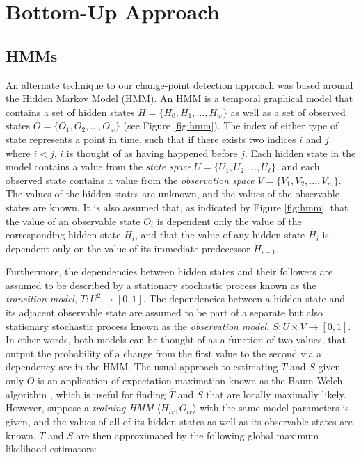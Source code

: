 \section{Bottom-Up Approach}
\label{sec:bottomup}

\subsection{HMMs}

An alternate technique to our change-point detection approach was based around
the Hidden Markov Model (HMM). An HMM is a temporal graphical model that contains a set of hidden states
$H = \{H_0,H_1, \ldots, H_w\}$ as well as a set of
observed states $O = \{O_1,O_2, \ldots, O_w\}$ (see Figure \ref{fig:hmm}). The index
of either type of state represents a point in time, such that if there exists
two indices $i$ and $j$ where $i < j$, $i$ is thought of as having happened
before $j$. Each hidden state in the model contains a value from the
\emph{state space} $U=\{U_1,U_2, \ldots, U_{\ell}\}$, and each
observed state contains a value from the \emph{observation space}
$V=\{V_1,V_2, \ldots, V_m\}$.
The values of the hidden states are unknown, and the values of the observable
states are known.
It is also assumed that, as indicated by Figure \ref{fig:hmm}, that the
value of an observable state $O_i$ is dependent only the value of the corresponding
hidden state $H_i$, and that the value of any hidden state $H_i$ is dependent only on
the value of its immediate predecessor $H_{i-1}$.

Furthermore, the dependencies between hidden states and their followers are
assumed to be described by a stationary stochastic process known as the
\emph{transition model}, \mbox{$T: U^2 \rightarrow [0,1]$}. The dependencies
between a hidden state and its adjacent observable state are assumed to be part
of a separate but also stationary stochastic process known as the
\emph{observation model}, $S: U \times V \rightarrow [0,1]$. In other words,
both models can be thought of as a function of two values, that output the
probability of a change from the first value to the second via a dependency
arc in the HMM. The usual approach to estimating $T$ and $S$ given only
$O$ is an application of expectation maximation known as the Baum-Welch algorithm
\cite{baum70},
which is useful for finding $\hat{T}$ and $\hat{S}$ that are locally maximally
likely. However, suppose a \emph{training HMM} $\langle H_{tr},O_{tr} \rangle$
with the same model parameters is given, and the values of all of its hidden states as well as its
observable states are known. $T$ and $S$ are then approximated by the
following global maximum likelihood estimators:

